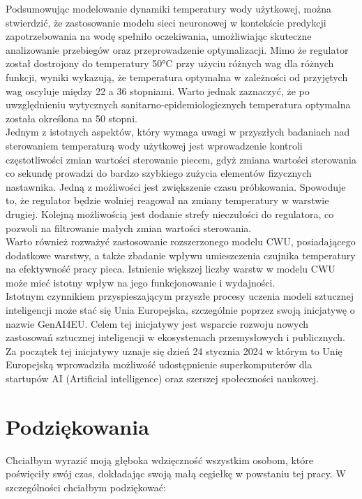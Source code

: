 \documentclass[a4paper,twoside,12pt]{book}
\begin{document}
Podsumowując modelowanie dynamiki temperatury wody użytkowej, można stwierdzić, że zastosowanie modelu sieci neuronowej w kontekście predykcji zapotrzebowania na wodę spełniło oczekiwania, umożliwiając skuteczne analizowanie przebiegów oraz przeprowadzenie optymalizacji. Mimo że regulator został dostrojony do temperatury 50°C przy użyciu różnych wag dla różnych funkcji, wyniki wykazują, że temperatura optymalna w zależności od przyjętych wag oscyluje między 22 a 36 stopniami. Warto jednak zaznaczyć, że po uwzględnieniu wytycznych sanitarno-epidemiologicznych temperatura optymalna została określona na 50 stopni.\\
Jednym z istotnych aspektów, który wymaga uwagi w przyszłych badaniach nad sterowaniem temperaturą wody użytkowej jest wprowadzenie kontroli częstotliwości zmian wartości sterowanie piecem, gdyż zmiana wartości sterowania co sekundę prowadzi do bardzo szybkiego zużycia elementów fizycznych nastawnika. Jedną z możliwości jest zwiększenie czasu próbkowania. Spowoduje to, że regulator będzie wolniej reagował na zmiany temperatury w warstwie drugiej. Kolejną możliwością jest dodanie strefy nieczułości do regulatora, co pozwoli na filtrowanie małych zmian wartości sterowania.\\
Warto również rozważyć zastosowanie rozszerzonego modelu CWU, posiadającego dodatkowe warstwy, a także zbadanie wpływu umieszczenia czujnika temperatury na efektywność pracy pieca. Istnienie większej liczby warstw w modelu CWU może mieć istotny wpływ na jego funkcjonowanie i wydajności.\\

Istotnym czynnikiem przyspieszającym przyszłe procesy uczenia modeli sztucznej inteligencji może stać się Unia Europejska, szczególnie poprzez swoją inicjatywę o nazwie GenAI4EU\cite{bib:Unia_Ai}. Celem tej inicjatywy jest wsparcie rozwoju nowych zastosowań sztucznej inteligencji w ekosystemach przemysłowych i publicznych. Za początek tej inicjatywy uznaje się dzień 24 stycznia 2024 w którym to Unię Europejską wprowadziła możliwość udostępnienie superkomputerów dla startupów AI (Artificial intelligence) oraz szerszej społeczności naukowej.

\chapter*{Podziękowania}

Chciałbym wyrazić moją głęboka wdzięczność wszystkim osobom, które poświęciły swój czas, dokładając swoją małą cegiełkę w powstaniu tej pracy. W szczególności chciałbym podziękować:\\
\end{document}
